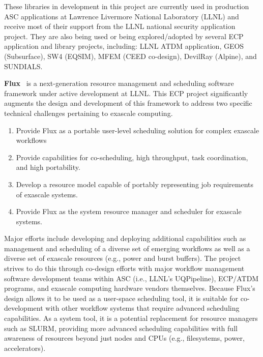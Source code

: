 These libraries in development in this project are currently used in
production ASC applications at Lawrence Livermore National Laboratory
(LLNL) and receive most of their support from the LLNL national security
application project. They are also being used or being explored/adopted
by several ECP application and library projects, including: LLNL ATDM
application, GEOS (Subsurface), SW4 (EQSIM), MFEM (CEED co-design),
DevilRay (Alpine), and SUNDIALS.

\textbf{Flux}~\cite{Ahn:2014:Flux,FluxSC18} is a next-generation resource
management and scheduling software framework under active development at
LLNL. This ECP project significantly augments the design and development
of this framework to address two specific technical challenges pertaining
to exascale computing.

\begin{enumerate}
\item Provide Flux as a portable user-level scheduling solution for complex
      exascale workflows

\item Provide capabilities for co-scheduling, high throughput, task
      coordination, and high portability.

\item Develop a resource model capable of portably representing job
      requirements of exascale systems.

\item Provide Flux as the system resource manager and scheduler for exascale
      systems.
\end{enumerate}

Major efforts include developing and deploying additional capabilities
such as management and scheduling of a diverse set of emerging workflows
as well as a diverse set of exascale resources (e.g., power and burst
buffers). The project strives to do this through co-design efforts with
major workflow management software development teams within ASC (i.e.,
LLNL’s UQPipeline), ECP/ATDM programs, and exascale computing hardware
vendors themselves. Because Flux’s design allows it to be used as a
user-space scheduling tool, it is suitable for co-development with other
workflow systems that require advanced scheduling capabilities. As a
system tool, it is a potential replacement for resource managers such as
SLURM, providing more advanced scheduling capabilities with full
awareness of resources beyond just nodes and CPUs (e.g., filesystems,
power, accelerators).

